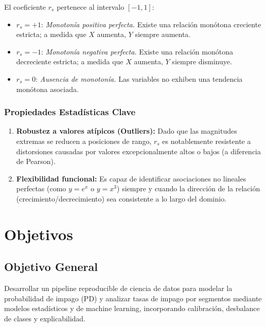 \documentclass[12pt]{article}
\begin{document}
El coeficiente $r_s$ pertenece al intervalo $[-1, 1]$:
\begin{itemize}
    \item \textbf{$r_s = +1$}: \textit{Monotonía positiva perfecta.} Existe una relación monótona creciente estricta; a medida que $X$ aumenta, $Y$ siempre aumenta.
    \item \textbf{$r_s = -1$}: \textit{Monotonía negativa perfecta.} Existe una relación monótona decreciente estricta; a medida que $X$ aumenta, $Y$ siempre disminuye.
    \item \textbf{$r_s = 0$}: \textit{Ausencia de monotonía.} Las variables no exhiben una tendencia monótona asociada.
\end{itemize}

\subsubsection*{Propiedades Estadísticas Clave}
\begin{enumerate}
    \item \textbf{Robustez a valores atípicos (Outliers):} Dado que las magnitudes extremas se reducen a posiciones de rango, $r_s$ es notablemente resistente a distorsiones causadas por valores excepcionalmente altos o bajos (a diferencia de Pearson).
    \item \textbf{Flexibilidad funcional:} Es capaz de identificar asociaciones no lineales perfectas (como $y = e^x$ o $y = x^3$) siempre y cuando la dirección de la relación (crecimiento/decrecimiento) sea consistente a lo largo del dominio.
\end{enumerate}

\section*{Objetivos}

\subsection*{Objetivo General}
Desarrollar un pipeline reproducible de ciencia de datos para modelar la probabilidad de impago (PD) y analizar tasas de impago por segmentos mediante modelos estadísticos y de machine learning, incorporando calibración, desbalance de clases y explicabilidad.
\end{document}
